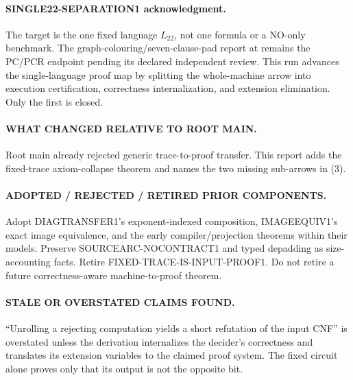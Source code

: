\documentclass[11pt]{article}
\newcommand{\Ltwo}{L_{22}}
\begin{document}
\paragraph{SINGLE22-SEPARATION1 acknowledgment.}
The target is the one fixed language \(\Ltwo\), not one formula or a NO-only
benchmark.  The graph-colouring/seven-clause-pad report at
remains the PC/PCR endpoint pending its declared independent review.  This run
advances the single-language proof map by splitting the whole-machine arrow
into execution certification, correctness internalization, and extension
elimination.  Only the first is closed.

\paragraph{WHAT CHANGED RELATIVE TO ROOT MAIN.}
Root main already rejected generic trace-to-proof transfer.  This report adds
the fixed-trace axiom-collapse theorem and names the two missing sub-arrows in
(3).

\paragraph{ADOPTED / REJECTED / RETIRED PRIOR COMPONENTS.}
Adopt DIAGTRANSFER1's exponent-indexed composition, IMAGEEQUIV1's exact image
equivalence, and the early compiler/projection theorems within their models.
Preserve SOURCEARC-NOCONTRACT1 and typed depadding as size-accounting facts.
Retire \textsf{FIXED-TRACE-IS-INPUT-PROOF1}.  Do not retire a future
correctness-aware machine-to-proof theorem.

\paragraph{STALE OR OVERSTATED CLAIMS FOUND.}
``Unrolling a rejecting computation yields a short refutation of the input
CNF'' is overstated unless the derivation internalizes the decider's
correctness and translates its extension variables to the claimed proof
system.  The fixed circuit alone proves only that its output is not the
opposite bit.
\end{document}
